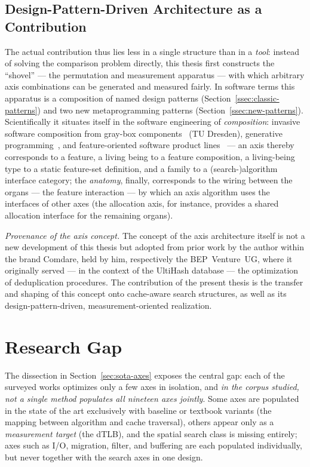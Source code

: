 \subsection{Design-Pattern-Driven Architecture as a Contribution}\label{ssec:sota-design-contribution}
The actual contribution thus lies less in a single structure than in a \emph{tool}: instead of
solving the comparison problem directly, this thesis first constructs the ``shovel'' --- the
permutation and measurement apparatus --- with which arbitrary axis combinations can be generated
and measured fairly. In software terms this apparatus is a composition of named design patterns
(Section~\ref{ssec:classic-patterns}) and two new metaprogramming patterns
(Section~\ref{ssec:new-patterns}). Scientifically it situates itself in the software engineering of
\emph{composition}: invasive software composition from gray-box
components~\cite{assmann2003invasive} (TU Dresden), generative
programming~\cite{czarnecki2000generative}, and feature-oriented software product
lines~\cite{apel2013feature,batory1992hierarchical} --- an axis thereby corresponds to a feature, a
living being to a feature composition, a living-being type to a static feature-set definition, and a
family to a (search-)algorithm interface category; the \emph{anatomy}, finally, corresponds to the
wiring between the organs --- the feature interaction --- by which an axis algorithm uses the
interfaces of other axes (the allocation axis, for instance, provides a shared allocation interface
for the remaining organs).

\emph{Provenance of the axis concept.} The concept of the axis architecture itself is not a new
development of this thesis but adopted from prior work by the author within the brand Comdare, held
by him, respectively the BEP~Venture~UG, where it originally served --- in the context of the
UltiHash database --- the optimization of deduplication procedures. The contribution of the present
thesis is the transfer and shaping of this concept onto cache-aware search structures, as well as
its design-pattern-driven, measurement-oriented realization.

\section{Research Gap}\label{sec:gap}

The dissection in Section~\ref{sec:sota-axes} exposes the central gap: each of the surveyed works
optimizes only a few axes in isolation, and
\emph{in the corpus studied, not a single method populates all nineteen axes jointly}. Some axes are
populated in the state of the art exclusively with baseline or textbook variants (the mapping
between algorithm and cache traversal), others appear only as a \emph{measurement target} (the
dTLB), and the spatial search class is missing entirely; axes such as I/O, migration, filter, and
buffering are each populated individually, but never together with the search axes in one design.

